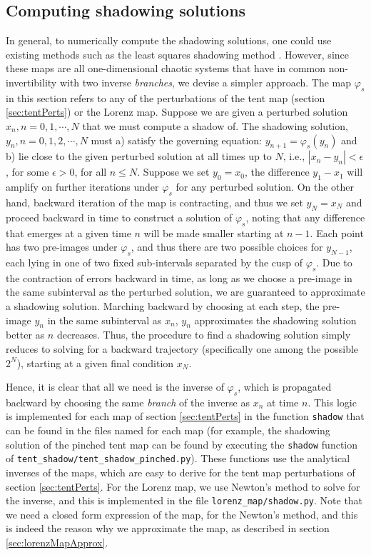 \subsection{Computing shadowing solutions}
\label{sec:computingShadowing}
		In general, to numerically compute the shadowing solutions, one could use existing methods such as 
		the least squares shadowing method \cite{qiqi-lss}. However, since these maps are all one-dimensional chaotic systems that have in common non-invertibility with two inverse \emph{branches}, we devise a simpler approach. The map $\varphi_s$ in this section refers to any of the perturbations of the tent map (section \ref{sec:tentPerts}) or the Lorenz map. Suppose we are given a perturbed solution $x_n, n =0,1,\cdots,N$ that we must compute a shadow of. 
The shadowing solution, $y_n, n=0,1,2,\cdots,N$ 
must a) satisfy the governing equation: $y_{n+1} = \varphi_s(y_n)$
and b) lie close to the given perturbed solution at all times up to 
$N$, i.e., $|x_n - y_n| < \epsilon$, for some $\epsilon > 0$, for all $n \leq N$. Suppose we set $y_0 = x_0$, the difference $y_1 - x_1$ will amplify on further iterations under $\varphi_s$ for any perturbed solution. On the other hand, backward iteration of the map is contracting, and thus we set $y_N = x_N$ and proceed backward in time to 
construct a solution of $\varphi_s$, noting that any difference that emerges at a given time $n$ will be made smaller starting at $n-1$. Each point has two pre-images under $\varphi_s$, and thus there are two possible choices for $y_{N-1}$, each lying in one of two fixed sub-intervals separated by the cusp of $\varphi_s$. Due to the contraction of errors backward in time, as long as we choose a pre-image in the same subinterval as the perturbed solution, we are guaranteed to approximate a shadowing solution. Marching backward by choosing at each step, the pre-image $y_n$ in the same subinterval as $x_n$, $y_n$ approximates the shadowing solution better as $n$ decreases. Thus, the procedure to find a shadowing solution simply reduces to solving for a backward trajectory (specifically one among the possible $2^N$), starting at a given final condition $x_N$.
	
		Hence, it is clear that all we need is the inverse of 
		$\varphi_s$, which is propagated backward by choosing the same \emph{branch} of the inverse as $x_n$ at time $n$. This logic is implemented for each map of section \ref{sec:tentPerts} in the function \verb+shadow+ that can be found in the files named for each map (for example, the shadowing solution of the pinched tent map can be found by executing the \verb+shadow+ function of \verb+tent_shadow/tent_shadow_pinched.py+). These functions use the analytical inverses of the maps, which are easy to derive for the tent map perturbations of section \ref{sec:tentPerts}. For the Lorenz map, we use Newton's method to solve for the inverse, and this is implemented in the file \verb+lorenz_map/shadow.py+. Note that we need a closed form expression of the map, for the Newton's method, and this is indeed the reason why we approximate the map, as described in section \ref{sec:lorenzMapApprox}.


